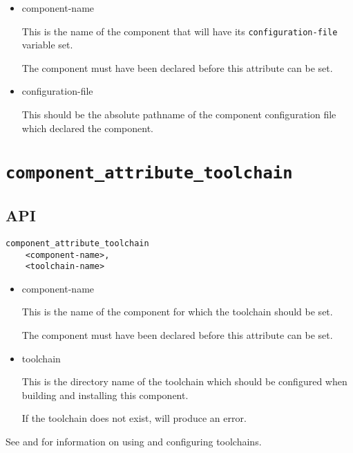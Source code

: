 \begin{itemize}
\item component-name

  This is the name of the component that will have its
  \texttt{configuration-file} variable set.

  The component must have been declared before this attribute can be
  set.

\item configuration-file

  This should be the absolute pathname of the component configuration
  file which declared the component.

\end{itemize}


\section{\texttt{component\_attribute\_toolchain}}\label{api:toolchain}

\subsection{API}

\begin{verbatim}
component_attribute_toolchain
    <component-name>,
    <toolchain-name>
\end{verbatim}

\begin{itemize}
\item component-name

  This is the name of the component for which the toolchain should be
  set.

  The component must have been declared before this attribute can be
  set.

\item toolchain

  This is the directory name of the toolchain which should be
  configured when building and installing this component.

  If the toolchain does not exist, \lmsbw will produce an
  error.
\end{itemize}

See  and
 for information on using and
configuring toolchains.
